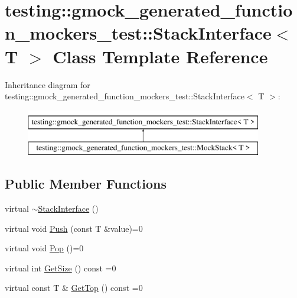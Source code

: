 \hypertarget{classtesting_1_1gmock__generated__function__mockers__test_1_1StackInterface}{}\section{testing\+::gmock\+\_\+generated\+\_\+function\+\_\+mockers\+\_\+test\+::Stack\+Interface$<$ T $>$ Class Template Reference}
\label{classtesting_1_1gmock__generated__function__mockers__test_1_1StackInterface}
Inheritance diagram for testing\+::gmock\+\_\+generated\+\_\+function\+\_\+mockers\+\_\+test\+::Stack\+Interface$<$ T $>$\+:\begin{figure}[H]
\begin{center}
\leavevmode
\includegraphics[height=2.000000cm]{classtesting_1_1gmock__generated__function__mockers__test_1_1StackInterface}
\end{center}
\end{figure}
\subsection*{Public Member Functions}
\begin{DoxyCompactItemize}
\item 
virtual \mbox{\hyperlink{classtesting_1_1gmock__generated__function__mockers__test_1_1StackInterface_a87b83db3e9cb1c986d6b0649b37cfa7c}{$\sim$\+Stack\+Interface}} ()
\item 
virtual void \mbox{\hyperlink{classtesting_1_1gmock__generated__function__mockers__test_1_1StackInterface_a49448f6195021fee947d37b80b6e5d30}{Push}} (const T \&value)=0
\item 
virtual void \mbox{\hyperlink{classtesting_1_1gmock__generated__function__mockers__test_1_1StackInterface_a1a6646d1d9febe90c607b9b3e4539b67}{Pop}} ()=0
\item 
virtual int \mbox{\hyperlink{classtesting_1_1gmock__generated__function__mockers__test_1_1StackInterface_a537ec8647a2333f50e5f923a85b90eba}{Get\+Size}} () const =0
\item 
virtual const T \& \mbox{\hyperlink{classtesting_1_1gmock__generated__function__mockers__test_1_1StackInterface_af36e32b9ae568100363466d1ebf95364}{Get\+Top}} () const =0
\end{DoxyCompactItemize}



